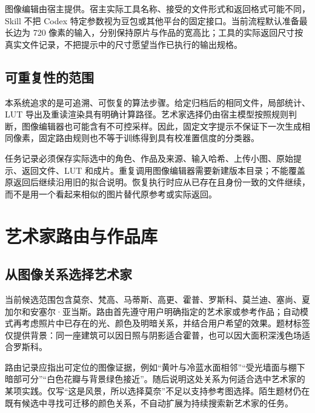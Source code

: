 图像编辑由宿主提供。宿主实际工具名称、接受的文件形式和返回格式可能不同，Skill 不把 Codex 特定参数视为豆包或其他平台的固定接口。当前流程默认准备最长边为 720 像素的输入，分别保持原片与作品的宽高比；工具的实际返回尺寸按真实文件记录，不把提示中的尺寸愿望当作已执行的输出规格。

\subsection{可重复性的范围}
本系统追求的是可追溯、可恢复的算法步骤。给定归档后的相同文件，局部统计、LUT 导出及重读渲染具有明确计算路径。艺术家选择仍由宿主模型按照规则判断，图像编辑器也可能含有不可控采样。因此，固定文字提示不保证下一次生成相同像素，固定路由规则也不等于训练得到具有校准置信度的分类器。

任务记录必须保存实际选中的角色、作品及来源、输入哈希、上传小图、原始提示、返回文件、LUT 和成片。重复调用图像编辑器需要新建版本目录；不能覆盖原返回后继续沿用旧的拟合说明。恢复执行时应从已存在且身份一致的文件继续，而不是用一个看起来相似的图片替代原参考或实际返回。

\section{艺术家路由与作品库}
\subsection{从图像关系选择艺术家}
当前候选范围包含莫奈、梵高、马蒂斯、高更、霍普、罗斯科、莫兰迪、塞尚、夏加尔和安塞尔·亚当斯。路由首先遵守用户明确指定的艺术家或参考作品；自动模式再考虑照片中已存在的光、颜色及明暗关系，并结合用户希望的效果。题材标签仅提供背景：同一座建筑可以因日照与阴影适合霍普，也可以因大面积深浅色场适合罗斯科。

路由记录应指出可定位的图像证据，例如“黄叶与冷蓝水面相邻”“受光墙面与棚下暗部可分”“白色花瓣与背景绿色接近”。随后说明这处关系为何适合选中艺术家的某项实践。仅写“这是风景，所以选择莫奈”不足以支持参考图选择。陌生题材仍在既有候选中寻找可迁移的颜色关系，不自动扩展为持续搜索新艺术家的任务。

